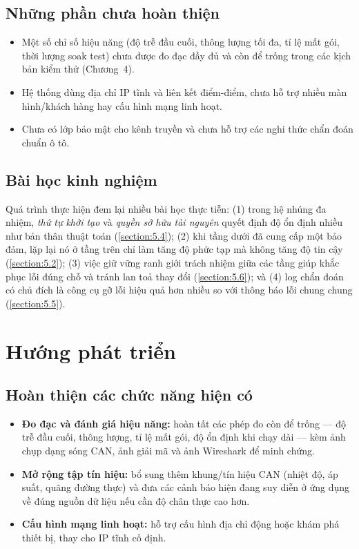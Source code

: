 \documentclass[../DoAn.tex]{subfiles}
\begin{document}
\subsection*{Những phần chưa hoàn thiện}
\begin{itemize}
  \item Một số chỉ số hiệu năng (độ trễ đầu cuối, thông lượng tối đa, tỉ lệ mất
    gói, thời lượng soak test) chưa được đo đạc đầy đủ và còn để trống trong các
    kịch bản kiểm thử (Chương~4).
  \item Hệ thống dùng địa chỉ IP tĩnh và liên kết điểm-điểm, chưa hỗ trợ nhiều
    màn hình/khách hàng hay cấu hình mạng linh hoạt.
  \item Chưa có lớp bảo mật cho kênh truyền và chưa hỗ trợ các nghi thức chẩn đoán
    chuẩn ô tô.
\end{itemize}

\subsection*{Bài học kinh nghiệm}
Quá trình thực hiện đem lại nhiều bài học thực tiễn: (1) trong hệ nhúng đa nhiệm,
\emph{thứ tự khởi tạo} và \emph{quyền sở hữu tài nguyên} quyết định độ ổn định
nhiều như bản thân thuật toán (\ref{section:5.4}); (2) khi tầng dưới đã cung cấp
một bảo đảm, lặp lại nó ở tầng trên chỉ làm tăng độ phức tạp mà không tăng độ tin
cậy (\ref{section:5.2}); (3) việc giữ vững ranh giới trách nhiệm giữa các tầng
giúp khắc phục lỗi đúng chỗ và tránh lan toả thay đổi (\ref{section:5.6}); và
(4) log chẩn đoán có chủ đích là công cụ gỡ lỗi hiệu quả hơn nhiều so với thông
báo lỗi chung chung (\ref{section:5.5}).

\section{Hướng phát triển}
\label{section:6.2}

\subsection*{Hoàn thiện các chức năng hiện có}
\begin{itemize}
  \item \textbf{Đo đạc và đánh giá hiệu năng:} hoàn tất các phép đo còn để trống
    — độ trễ đầu cuối, thông lượng, tỉ lệ mất gói, độ ổn định khi chạy dài — kèm
    ảnh chụp dạng sóng CAN, ảnh giải mã và ảnh Wireshark để minh chứng.
  \item \textbf{Mở rộng tập tín hiệu:} bổ sung thêm khung/tín hiệu CAN (nhiệt độ,
    áp suất, quãng đường thực) và đưa các cảnh báo hiện đang suy diễn ở ứng dụng
    về đúng nguồn dữ liệu nếu cần độ chân thực cao hơn.
  \item \textbf{Cấu hình mạng linh hoạt:} hỗ trợ cấu hình địa chỉ động hoặc khám
    phá thiết bị, thay cho IP tĩnh cố định.
\end{itemize}
\end{document}
